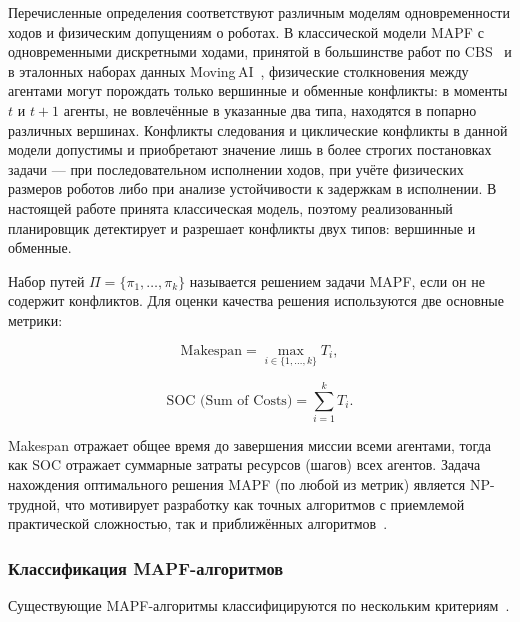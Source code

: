 Перечисленные определения соответствуют различным моделям одновременности ходов и физическим допущениям о роботах. В классической модели MAPF с одновременными дискретными ходами, принятой в большинстве работ по CBS~\cite{sharon2015cbs, li2021eecbs} и в эталонных наборах данных Moving\,AI~\cite{sturtevant2012benchmarks}, физические столкновения между агентами могут порождать только вершинные и обменные конфликты: в моменты $t$ и $t+1$ агенты, не вовлечённые в указанные два типа, находятся в попарно различных вершинах. Конфликты следования и циклические конфликты в данной модели допустимы и приобретают значение лишь в более строгих постановках задачи --- при последовательном исполнении ходов, при учёте физических размеров роботов либо при анализе устойчивости к задержкам в исполнении. В настоящей работе принята классическая модель, поэтому реализованный планировщик детектирует и разрешает конфликты двух типов: вершинные и обменные.

Набор путей $\Pi = \{\pi_1, \ldots, \pi_k\}$ называется решением задачи MAPF, если он не содержит конфликтов. Для оценки качества решения используются две основные метрики:

\begin{equation}
    \label{eq:makespan}
    \text{Makespan} = \max_{i \in \{1, \ldots, k\}} T_i,
\end{equation}

\begin{equation}
    \label{eq:soc}
    \text{SOC (Sum of Costs)} = \sum_{i=1}^{k} T_i.
\end{equation}

Makespan отражает общее время до завершения миссии всеми агентами, тогда как SOC отражает суммарные затраты ресурсов (шагов) всех агентов. Задача нахождения оптимального решения MAPF (по любой из метрик) является NP-трудной, что мотивирует разработку как точных алгоритмов с приемлемой практической сложностью, так и приближённых алгоритмов~\cite{yu2013mapf_complexity}.

\subsubsection{Классификация MAPF-алгоритмов}

Существующие MAPF-алгоритмы классифицируются по нескольким критериям~\cite{stern2019mapf}.

